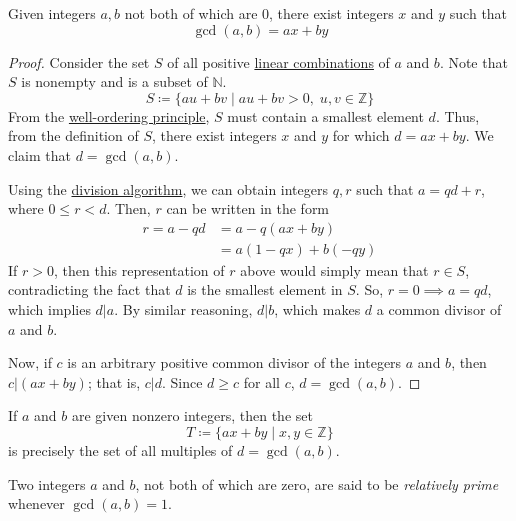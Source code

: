 \documentclass{article}
\newcounter{theorem}[section]
\newcounter{definition}[section]
\begin{document}
\begin{theorem}
  \label{thm:bezouts-identity}
Given integers $a, b$ not both of which are $0$, there exist integers $x$ and $y$ such that
\begin{equation}
  \gcd(a, b) = a x + b y
\end{equation}
\end{theorem}
\begin{proof}
Consider the set $S$ of all positive \hyperref[lin-def:linear-combination]{linear combinations} of $a$ and $b$. Note that $S$ is nonempty and is a subset of $\mathbb{N}$. 
\begin{equation}
  S \coloneqq \{ au + bv \;|\; au+bv > 0, \; u, v \in \mathbb{Z}\}
\end{equation}
From the \hyperref[thm:well-ordering-principle]{well-ordering principle}, $S$ must contain a smallest element $d$. Thus, from the definition of $S$, there exist integers $x$ and $y$ for which $d = ax + by$. We claim that $d = \gcd(a, b)$. 

Using the \hyperref[thm:division-algorithm]{division algorithm}, we can obtain integers $q, r$ such that $a = qd + r$, where $0 \leq r < d$. Then, $r$ can be written in the form 
\begin{align*}
    r = a - qd & = a - q(ax + by) \\
    & = a(1 - qx) + b(-qy)
\end{align*}
If $r >0$, then this representation of $r$ above would simply mean that $r \in S$, contradicting the fact that $d$ is the smallest element in $S$. So, $r = 0 \implies a = qd$, which implies $d | a$. By similar reasoning, $d|b$, which makes $d$ a common divisor of $a$ and $b$. 

Now, if $c$ is an arbitrary positive common divisor of the integers $a$ and $b$, then $c | (ax+by)$; that is, $c|d$. Since $d \geq c$ for all $c$, $d = \gcd(a, b)$. 
\end{proof}

\begin{corollary}
  \label{thm:integer-combinations-as-multiples-of-the-gcd}
If $a$ and $b$ are given nonzero integers, then the set
\begin{equation}
  T \coloneqq \{ax + by \;|\; x, y \in \mathbb{Z}\}
\end{equation}
is precisely the set of all multiples of $d = \gcd(a, b)$. 
\end{corollary}

\begin{definition}
  \label{def:relatively-prime}
Two integers $a$ and $b$, not both of which are zero, are said to be \textit{relatively prime} whenever $\gcd(a, b) = 1$. 
\end{definition}
\end{document}
